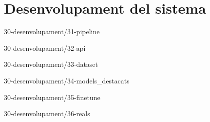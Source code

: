 \chapter{Desenvolupament del sistema}

{30-desenvolupament/31-pipeline}

{30-desenvolupament/32-api}

{30-desenvolupament/33-dataset}

{30-desenvolupament/34-models_destacats}

{30-desenvolupament/35-finetune}

{30-desenvolupament/36-reals}

